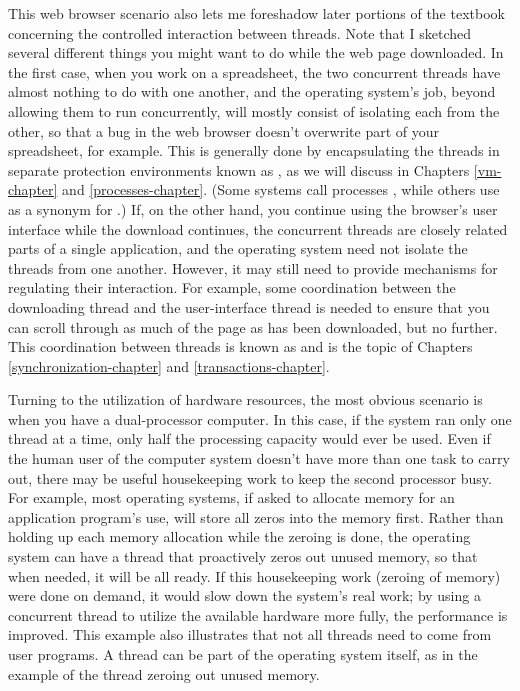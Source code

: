 This web browser scenario also lets me foreshadow later portions of
the textbook concerning the controlled interaction between threads.
Note that I sketched several different things you might want
to do while the web page downloaded.  In the first case, when you work
on a spreadsheet, the two concurrent threads have almost nothing to do
with one another, and the operating system's job, beyond allowing them
to run concurrently, will mostly consist of isolating each from the
other, so that a bug in the web browser doesn't overwrite part of your
spreadsheet, for example.  This is generally done by encapsulating the
threads in separate protection environments known as , as we
will discuss in Chapters \ref{vm-chapter} and \ref{processes-chapter}.  (Some systems call processes
, while others use  as a synonym for .)
If, on the other hand, you continue using the browser's user interface
while the download continues, the concurrent threads are closely
related parts of a single application, and the operating system need
not isolate the threads from one another.  However, it may still need
to provide mechanisms for regulating their interaction.  For example,
some coordination between the downloading thread and the
user-interface thread is needed to ensure that you can scroll through
as much of the page as has been downloaded, but no further.  This
coordination between threads is known as  and is
the topic of Chapters \ref{synchronization-chapter} and \ref{transactions-chapter}.

Turning to the utilization of hardware resources, the most obvious
scenario is when you have a dual-processor computer.  In this case, if
the system ran only one thread at a time, only half the processing
capacity would ever be used.  Even if the human user of the computer
system doesn't have more than one task to carry out, there may be
useful housekeeping work to keep the second processor busy.  For
example, most operating systems, if asked to allocate memory for an
application program's use, will store all zeros into the memory first.
Rather than holding up each memory allocation while the zeroing is
done, the operating system can have a thread that proactively zeros
out unused memory, so that when needed, it will be all ready.  If this
housekeeping work (zeroing of memory) were done on demand, it would
slow down the system's real work; by using a concurrent thread to
utilize the available hardware more fully, the performance is
improved.  This example also illustrates that not all threads need to
come from user programs.  A thread can be part of the operating system
itself, as in the example of the thread zeroing out unused memory.

